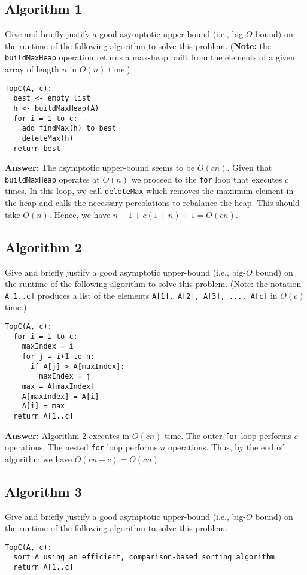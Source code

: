 \documentclass[11pt, oneside]{article}   	%
\theoremstyle{definition}
\theoremstyle{remark}
\begin{document}
\subsection{Algorithm 1}
Give and briefly justify a good asymptotic upper-bound (i.e., big-$O$
bound) on the runtime of the following algorithm to solve this
problem. (\textbf{Note:} the \texttt{buildMaxHeap} operation returns a max-heap
built from the elements of a given array of length $n$ in $O(n)$
time.)
\begin{verbatim}
TopC(A, c):
  best <- empty list
  h <- buildMaxHeap(A)
  for i = 1 to c:
    add findMax(h) to best
    deleteMax(h)
  return best
\end{verbatim}

\textbf{Answer: } The asymptotic upper-bound seems to be $O(cn)$. Given that \texttt{buildMaxHeap} operates at $O(n)$ we proceed to the \texttt{for} loop that executes $c$ times. In this loop, we call \texttt{deleteMax} which removes the maximum element in the heap and calls the necessary percolations to rebalance the heap. This should take $O(n)$. Hence, we have $n+1+c(1+n)+1 = O(cn)$.

\subsection{Algorithm 2}
Give and briefly justify a good asymptotic upper-bound (i.e., big-$O$
bound) on the runtime of the following algorithm to solve this
problem. (Note: the notation \texttt{A[1..c]} produces a list of the elements
\texttt{A[1], A[2], A[3], ..., A[c]} in $O(c)$ time.)
\begin{verbatim}
TopC(A, c):
  for i = 1 to c:
    maxIndex = i
    for j = i+1 to n:
      if A[j] > A[maxIndex]:
        maxIndex = j
    max = A[maxIndex]
    A[maxIndex] = A[i]
    A[i] = max
  return A[1..c]
\end{verbatim}

\textbf{Answer: } Algorithm 2 executes in $O(cn)$ time. The outer \texttt{for} loop  performs $c$ operations. The nested \texttt{for} loop performs  $n$ operations. Thus, by the end of algorithm we have $O(cn + c) = O(cn)$


\subsection{Algorithm 3}
Give and briefly justify a good asymptotic upper-bound (i.e., big-$O$
bound) on the runtime of the following algorithm to solve this
problem.
\begin{verbatim}
TopC(A, c):
  sort A using an efficient, comparison-based sorting algorithm
  return A[1..c]
\end{verbatim}
\end{document}
